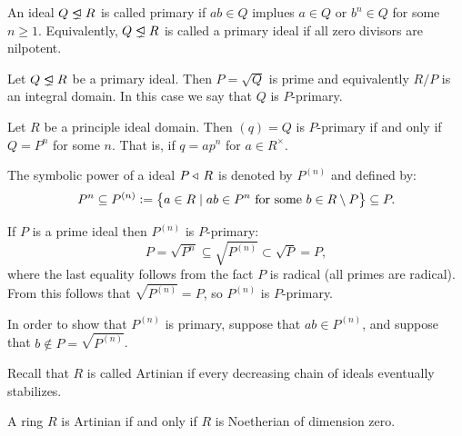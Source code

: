 \documentclass[11pt,a4paper]{article}
\begin{document}
\begin{definition}
  An ideal $Q \properideal R$ is called primary if $ab \in Q$
  implues $a \in Q$ or $b^n \in Q$ for some $n \geq 1$.
  Equivalently, $Q \properideal R$ is called a primary ideal if all
  zero divisors are nilpotent.
\end{definition}

\begin{remark}
  Let $Q \properideal R$ be a primary ideal.
  Then $P = \sqrt{Q}$ is prime and equivalently $R/P$ is an integral domain.
  In this case we say that $Q$ is $P$-primary.
\end{remark}

\begin{example}
  Let $R$ be a principle ideal domain.
  Then $(q) = Q$ is $P$-primary if and only if $Q = P^n$ for some $n$.
  That is, if $q = a p^n$ for $a \in R^{\times}$.
\end{example}

\begin{definition}
  The symbolic power of a ideal $P \triangleleft\, R$ is denoted by $P^{(n)}$
  and defined by:
  \[
    P^n \subseteq P^{(n)} :=
    \left\{a \in R \mid 
      ab \in P^n \text{ for some } b \in R \setminus P\right\} \subseteq P.
  \]
\end{definition}

\begin{remark}
  If $P$ is a prime ideal then $P^{(n)}$ is $P$-primary:
  \[
    P = \sqrt{P^n} \subseteq \sqrt{P^{(n)}} \subset \sqrt{P} = P,
  \]
  where the last equality follows from the fact $P$ is radical (all primes
  are radical).
  From this follows that $\sqrt{P^{(n)}} = P$, so $P^{(n)}$ is $P$-primary.

  In order to show that $P^{(n)}$ is primary,
  suppose that $ab \in P^{(n)}$,
  and suppose that $b \notin P = \sqrt{P^{(n)}}$.
\end{remark}

\begin{remark}
  Recall that $R$ is called Artinian if every decreasing chain of ideals
  eventually stabilizes.
\end{remark}

\begin{theorem}[Hopkins]
  \label{thm:hopkins}
  A ring $R$ is Artinian if and only if $R$ is Noetherian of dimension zero.
\end{theorem}
\end{document}
